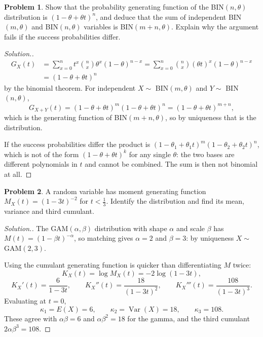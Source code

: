 \documentclass[11pt,a4paper]{article}
\theoremstyle{definition}
\newtheorem{problemx}{Problem}[subsection]
\newenvironment{problem}{\begin{problemx}}{\end{problemx}}
\newenvironment{solution}
  {\renewcommand{\qedsymbol}{}\begin{proof}[\textit{Solution}.]}
  {\end{proof}}
\DeclareMathOperator{\Var}{Var}
\begin{document}
\begin{problem}
Show that the probability generating function of the BIN$(n,\theta)$
distribution is $\left(1-\theta+\theta t\right)^{n}$, and deduce that the sum of
independent BIN$(m,\theta)$ and BIN$(n,\theta)$ variables is BIN$(m+n,\theta)$.
Explain why the argument fails if the success probabilities differ.
\end{problem}
\begin{solution}
\begin{align*}
G_X(t) &= \sum_{x=0}^{n}t^{x}\binom{n}{x}\theta^{x}(1-\theta)^{n-x}
= \sum_{x=0}^{n}\binom{n}{x}\left(\theta t\right)^{x}(1-\theta)^{n-x} \\
&= \left(1-\theta+\theta t\right)^{n}
\end{align*}
by the binomial theorem. For independent $X\sim$ BIN$(m,\theta)$ and
$Y\sim$ BIN$(n,\theta)$,
$$G_{X+Y}(t) = \left(1-\theta+\theta t\right)^{m}\left(1-\theta+\theta t\right)^{n}
= \left(1-\theta+\theta t\right)^{m+n},$$
which is the generating function of BIN$(m+n,\theta)$, so by uniqueness that is
the distribution.

If the success probabilities differ the product is
$\left(1-\theta_1+\theta_1t\right)^{m}\left(1-\theta_2+\theta_2t\right)^{n}$,
which is not of the form $\left(1-\theta+\theta t\right)^{k}$ for any single
$\theta$: the two bases are different polynomials in $t$ and cannot be combined.
The sum is then not binomial at all.
\end{solution}

\begin{problem}
A random variable has moment generating function
$M_X(t) = \left(1-3t\right)^{-2}$ for $t<\tfrac13$. Identify the distribution
and find its mean, variance and third cumulant.
\end{problem}
\begin{solution}
The GAM$(\alpha,\beta)$ distribution with shape $\alpha$ and scale $\beta$ has
$M(t) = (1-\beta t)^{-\alpha}$, so matching gives $\alpha=2$ and $\beta=3$: by
uniqueness $X\sim$ GAM$(2,3)$.

Using the cumulant generating function is quicker than differentiating $M$
twice:
$$K_X(t) = \log M_X(t) = -2\log(1-3t),$$
$$K_X'(t) = \frac{6}{1-3t},\qquad
K_X''(t) = \frac{18}{(1-3t)^{2}},\qquad
K_X'''(t) = \frac{108}{(1-3t)^{3}} .$$
Evaluating at $t=0$,
$$\kappa_1 = E(X) = 6,\qquad \kappa_2 = \Var(X) = 18,\qquad \kappa_3 = 108 .$$
These agree with $\alpha\beta = 6$ and $\alpha\beta^{2} = 18$ for the gamma, and
the third cumulant $2\alpha\beta^{3} = 108$.
\end{solution}
\end{document}
